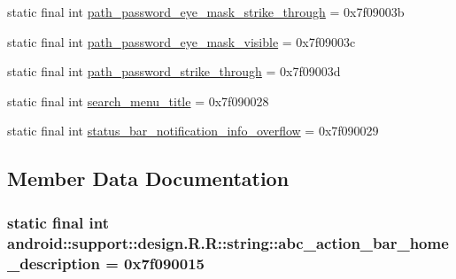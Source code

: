 \begin{CompactItemize}
\item 
static final int \hyperlink{classandroid_1_1support_1_1design_1_1_r_1_1string_a92d37a4d20d97b6eddd7d3b34a825d1}{path\_\-password\_\-eye\_\-mask\_\-strike\_\-through} = 0x7f09003b
\item 
static final int \hyperlink{classandroid_1_1support_1_1design_1_1_r_1_1string_e472e0c971064537b0f26693f6be5034}{path\_\-password\_\-eye\_\-mask\_\-visible} = 0x7f09003c
\item 
static final int \hyperlink{classandroid_1_1support_1_1design_1_1_r_1_1string_7039e588936d7afb8d47a2510ffce437}{path\_\-password\_\-strike\_\-through} = 0x7f09003d
\item 
static final int \hyperlink{classandroid_1_1support_1_1design_1_1_r_1_1string_cdd692c29f201e97e6241758f2d500e2}{search\_\-menu\_\-title} = 0x7f090028
\item 
static final int \hyperlink{classandroid_1_1support_1_1design_1_1_r_1_1string_0248a732417d9897eef9a77be30c28b7}{status\_\-bar\_\-notification\_\-info\_\-overflow} = 0x7f090029
\end{CompactItemize}


\subsection{Member Data Documentation}
\hypertarget{classandroid_1_1support_1_1design_1_1_r_1_1string_41f40787d19cfc993751b3f86a12cbb3}{
\subsubsection[{abc\_\-action\_\-bar\_\-home\_\-description}]{\setlength{\rightskip}{0pt plus 5cm}static final int android::support::design.R.R::string::abc\_\-action\_\-bar\_\-home\_\-description = 0x7f090015}}
\label{classandroid_1_1support_1_1design_1_1_r_1_1string_41f40787d19cfc993751b3f86a12cbb3}


